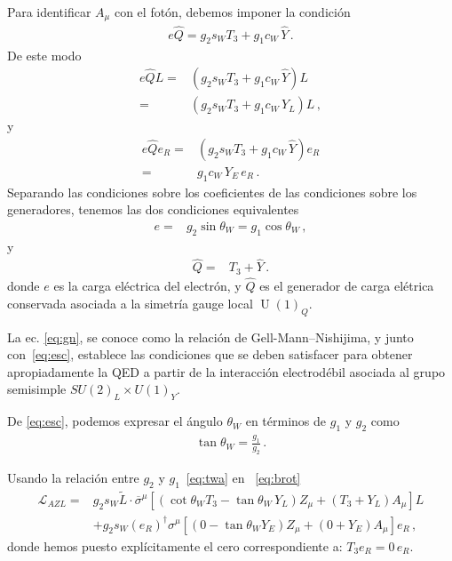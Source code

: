 \begin{frame}
Para identificar $A_{\mu}$ con el fotón, debemos imponer la condición
\begin{align}
e\widehat{Q}=g_2 s_W T_3+{g_1}c_W\,\widehat{Y}\,.
\end{align}
De este modo
\begin{align}
  e\widehat{Q}L =& \left(g_2 s_W T_3+{g_1}c_W\,\widehat{Y}\right) L \nonumber\\
=& \left(g_2 s_W T_3+{g_1}c_W\,Y_L\right) L \,,
\end{align}
y
\begin{align}
 e\widehat{Q} e_R =& \left(g_2 s_W T_3+{g_1}c_W\,\widehat{Y}\right) e_R\nonumber\\  
=& g_1 c_W\,Y_E \, e_R\,.
\end{align}
Separando las condiciones sobre los coeficientes de las condiciones sobre los generadores, tenemos las dos condiciones equivalentes
\begin{align}
\label{eq:esc}
    e=&g_2\sin\theta_W=g_1 \cos\theta_W\,,
\end{align}
y
\begin{align}
\label{eq:gn}
 \widehat{Q}=&T_3+\widehat{Y}\,.
\end{align}
donde $e$ es la carga eléctrica del electrón, y $\widehat{Q}$ es el generador de carga elétrica conservada asociada a la simetría gauge local $\operatorname{U}(1)_Q$. 

La ec. \eqref{eq:gn}, se conoce como la relación de Gell-Mann--Nishijima, y junto con~\eqref{eq:esc}, establece las condiciones que se deben satisfacer para obtener apropiadamente la QED a partir de la interacción electrodébil asociada al grupo semisimple $SU(2)_L\times  U(1)_Y$.


De \eqref{eq:esc}, podemos expresar el ángulo $\theta_W$ en términos de $g_1$ y $g_2$ como
\begin{align}
\label{eq:twa}
  \tan\theta_W=\frac{g_1}{g_2}\,.
\end{align}


Usando la relación entre $g_2$ y ${g_1}$~\eqref{eq:twa} en ~\eqref{eq:brot}
\begin{align}
    \mathcal{L}_{A Z L}
=&g_2 s_W \widetilde{L}\cdot\overline{\sigma}^\mu\left[\left(\cot\theta_WT_3- \tan\theta_W\,Y_L\right)Z_\mu
       +\left(T_3+Y_L\right) A_\mu\right]L \nonumber\\
&+g_2 s_W \left(e_R \right)^{\dagger}\sigma^\mu \left[ \left(0 -\tan\theta_W  Y_E  \right) Z_{\mu}  +\left( 0+ Y_E \right)  A_{\mu} \right]{e_R}\,,
\end{align}
donde hemos puesto explícitamente el cero correspondiente a: $T_3 e_R= 0 \,e_R$.


\end{frame}
